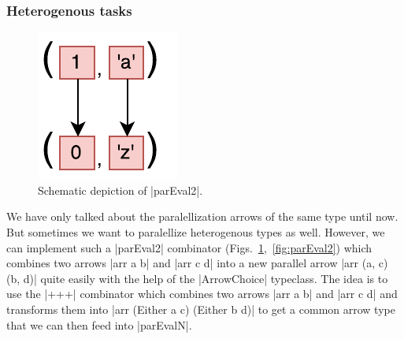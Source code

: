 \subsubsection{Heterogenous tasks}
\begin{figure}[tb]
	\includegraphics[scale=0.7]{images/parEval2}
	\caption{Schematic depiction of |parEval2|.}
	\label{fig:parEval2Img}
\end{figure}
We have only talked about the paralellization arrows of the same type until now. But sometimes we want to paralellize heterogenous types as well. However, we can implement such a |parEval2| combinator (Figs.~\ref{fig:parEval2Img},~\ref{fig:parEval2}) which combines two arrows |arr a b| and |arr c d| into a new parallel arrow |arr (a, c) (b, d)| quite easily with the help of the |ArrowChoice| typeclass. The idea is to use the |+++| combinator which combines two arrows |arr a b| and |arr c d| and transforms them into |arr (Either a c) (Either b d)| to get a common arrow type that we can then feed into |parEvalN|.


